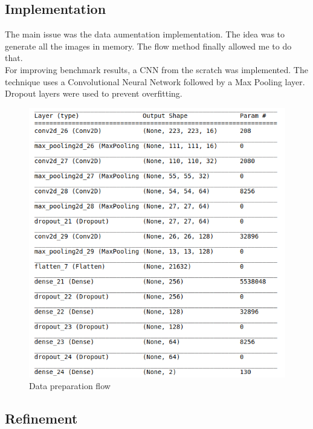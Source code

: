 \documentclass[a4paper,10pt]{article}
\begin{document}
\newpage
\subsection{Implementation}

The main issue was the data aumentation implementation. The idea was to generate all the images in memory. The flow method finally allowed me to do that.\\ 


For improving benchmark results, a CNN from the scratch was implemented. The technique uses a Convolutional Neural Network followed by a Max Pooling layer. \\

Dropout layers were used to prevent overfitting. \\ 

\begin{figure}[ht]
  \includegraphics[width=\linewidth]{my_net.png}
  \caption{Data preparation flow}
  \label{fig:boat1}
\end{figure}

\subsection{Refinement}
\end{document}
